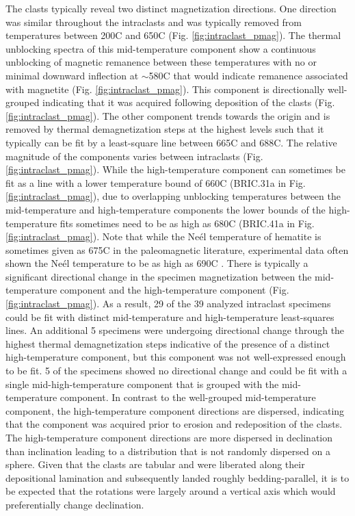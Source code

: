 \documentclass[11pt,letterpaper]{article}
\begin{document}
The clasts typically reveal two distinct magnetization directions. One direction was similar throughout the intraclasts and was typically removed from temperatures between 200\textdegree C and 650\textdegree C (Fig. \ref{fig:intraclast_pmag}). The thermal unblocking spectra of this mid-temperature component show a continuous unblocking of magnetic remanence between these temperatures with no or minimal downward inflection at $\sim$580\textdegree C that would indicate remanence associated with magnetite (Fig. \ref{fig:intraclast_pmag}). This component is directionally well-grouped indicating that it was acquired following deposition of the clasts (Fig. \ref{fig:intraclast_pmag}). The other component trends towards the origin and is removed by thermal demagnetization steps at the highest levels such that it typically can be fit by a least-square line between 665\textdegree C and 688\textdegree C. The relative magnitude of the components varies between intraclasts (Fig. \ref{fig:intraclast_pmag}). While the high-temperature component can sometimes be fit as a line with a lower temperature bound of 660\textdegree C (BRIC.31a in Fig. \ref{fig:intraclast_pmag}), due to overlapping unblocking temperatures between the mid-temperature and high-temperature components the lower bounds of the high-temperature fits sometimes need to be as high as 680\textdegree C (BRIC.41a in Fig. \ref{fig:intraclast_pmag}). Note that while the Ne\'el temperature of hematite is sometimes given as 675\textdegree C in the paleomagnetic literature, experimental data often shown the Ne\'el temperature to be as high as 690\textdegree C \citep{Ozdemir2006a}. There is typically a significant directional change in the specimen magnetization between the mid-temperature component and the high-temperature component (Fig. \ref{fig:intraclast_pmag}). As a result, 29 of the 39 analyzed intraclast specimens could be fit with distinct mid-temperature and high-temperature least-squares lines. An additional 5 specimens were undergoing directional change through the highest thermal demagnetization steps indicative of the presence of a distinct high-temperature component, but this component was not well-expressed enough to be fit. 5 of the specimens showed no directional change and could be fit with a single mid-high-temperature component that is grouped with the mid-temperature component. In contrast to the well-grouped mid-temperature component, the high-temperature component directions are dispersed, indicating that the component was acquired prior to erosion and redeposition of the clasts. The high-temperature component directions are more dispersed in declination than inclination leading to a distribution that is not randomly dispersed on a sphere. Given that the clasts are tabular and were liberated along their depositional lamination and subsequently landed roughly bedding-parallel, it is to be expected that the rotations were largely around a vertical axis which would preferentially change declination.
\end{document}

